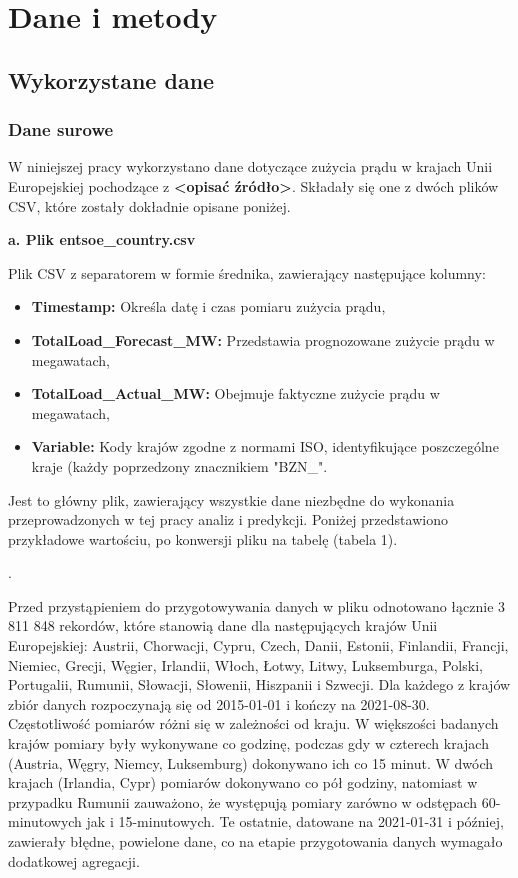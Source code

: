 \documentclass[polish, twoside, 12pt, a4paper]{article}
\theoremstyle{definition}
\theoremstyle{plain}
\theoremstyle{remark}
\begin{document}
\section{Dane i metody}

\subsection{Wykorzystane dane}

\subsubsection{Dane surowe}

W niniejszej pracy wykorzystano dane dotyczące zużycia prądu w krajach Unii Europejskiej pochodzące z \textbf{<opisać źródło>}. Składały się one z dwóch plików CSV, które zostały dokładnie opisane poniżej. 

\textbf{a. Plik entsoe\_country.csv}

Plik CSV z separatorem w formie średnika, zawierający następujące kolumny:

\begin{itemize}
    \item \textbf{Timestamp:} Określa datę i czas pomiaru zużycia prądu,
    \item \textbf{TotalLoad\_Forecast\_MW:} Przedstawia prognozowane zużycie prądu w megawatach,
    \item \textbf{TotalLoad\_Actual\_MW:} Obejmuje faktyczne zużycie prądu w megawatach,
    \item \textbf{Variable:} Kody krajów zgodne z normami ISO, identyfikujące poszczególne kraje (każdy poprzedzony znacznikiem "BZN\_".
\end{itemize}

Jest to główny plik, zawierający wszystkie dane niezbędne do wykonania przeprowadzonych w tej pracy analiz i predykcji. Poniżej przedstawiono przykładowe wartościu, po konwersji pliku na tabelę (tabela 1). 

. 

Przed przystąpieniem do przygotowywania danych w pliku odnotowano łącznie 3 811 848 rekordów, które stanowią dane dla następujących krajów Unii Europejskiej: Austrii, Chorwacji, Cypru, Czech, Danii, Estonii, Finlandii, Francji, Niemiec, Grecji, Węgier, Irlandii, Włoch, Łotwy, Litwy, Luksemburga, Polski, Portugalii, Rumunii, Słowacji, Słowenii, Hiszpanii i Szwecji. 
Dla każdego z krajów zbiór danych rozpoczynają się od 2015-01-01 i kończy na 2021-08-30. Częstotliwość pomiarów różni się w zależności od kraju. W większości badanych krajów pomiary były wykonywane co godzinę, podczas gdy w czterech krajach (Austria, Węgry, Niemcy, Luksemburg) dokonywano ich co 15 minut. W dwóch krajach (Irlandia, Cypr) pomiarów dokonywano co pół godziny, natomiast w przypadku Rumunii zauważono, że występują pomiary zarówno w odstępach 60-minutowych jak i 15-minutowych. Te ostatnie, datowane na 2021-01-31 i później, zawierały błędne, powielone dane, co na etapie przygotowania danych wymagało dodatkowej agregacji. 
\end{document}

